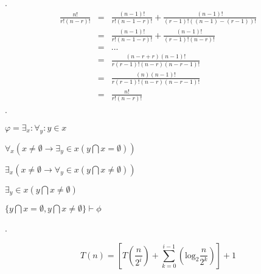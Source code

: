 \documentclass[a4paper,12pt]{article}
\begin{document}
.
\begin{eqnarray*}
\frac{n!}{r!(n-r)!} & = & \frac{(n-1)!}{r!(n-1-r)!} + \frac{(n-1)!}{(r-1)!((n-1)-(r-1))!} \\
                    & = & \frac{(n-1)!}{r!(n-1-r)!} + \frac{(n-1)!}{(r-1)!(n-r)!} \\
                    & = & ... \\
                    & = & \frac{(n-r+r)(n-1)!}{r(r-1)!(n-r)(n-r-1)!} \\
                    & = & \frac{(n)(n-1)!}{r(r-1)!(n-r)(n-r-1)!} \\
                    & = & \frac{n!}{r!(n-r)!}
\end{eqnarray*}
.

\begin{center}
$ \varphi = \exists_x :\forall_y : y \in x$

$ \forall_x(x \neq \emptyset \rightarrow \exists_y \in x(y \bigcap x = \emptyset))$

$ \exists_x(x \neq \emptyset \rightarrow \forall_y \in x(y \bigcap x \neq \emptyset))$

$ \exists_y \in x(y \bigcap x \neq \emptyset)$

$ \{ y \bigcap x = \emptyset, y \bigcap x \neq \emptyset \} \vdash \phi$
\end{center}
.

\begin{center}
\[ T(n) = \left[ T\left(\frac{n}{2^i}\right) + \sum_{k=0}^{i-1} \left( \textrm{log}_2 \frac{n}{2^k} \right) \right] + 1 \]
\end{center}
\end{document}

